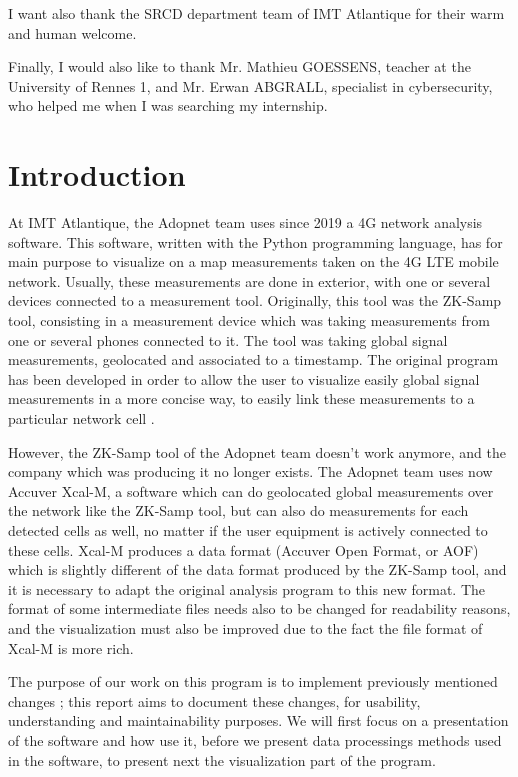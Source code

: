 \documentclass[a4paper, 11pt]{report}
\begin{document}
    I want also thank the SRCD department team of IMT Atlantique for their warm and human welcome. \newline
    
    Finally, I would also like to thank Mr. Mathieu GOESSENS, teacher at the University of Rennes 1, and Mr. Erwan ABGRALL, specialist in cybersecurity, who helped me when I was searching my internship.
    
    \newpage
    
    
    \section*{Introduction}
    At IMT Atlantique, the Adopnet team uses since 2019 a 4G network analysis software. This software, written with the Python programming language, has for main purpose to visualize on a map measurements taken on the 4G LTE mobile network. Usually, these measurements are done in exterior, with one or several devices connected to a measurement tool. Originally, this tool was the ZK-Samp tool, consisting in a measurement device which was taking measurements from one or several phones connected to it. The tool was taking global signal measurements, geolocated and associated to a timestamp. The original program has been developed in order to allow the user to visualize easily global signal measurements in a more concise way, to easily link these measurements to a particular network cell \cite{trieu_visualization_2019}. \newline
    
    However, the ZK-Samp tool of the Adopnet team doesn't work anymore, and the company which was producing it no longer exists. The Adopnet team uses now Accuver Xcal-M, a software which can do geolocated global measurements over the network like the ZK-Samp tool, but can also do measurements for each detected cells as well, no matter if the user equipment is actively connected to these cells. Xcal-M produces a data format (Accuver Open Format, or AOF) which is slightly different of the data format produced by the ZK-Samp tool, and it is necessary to adapt the original analysis program to this new format. The format of some intermediate files needs also to be changed for readability reasons, and the visualization must also be improved due to the fact the file format of Xcal-M is more rich.\newline
    
    The purpose of our work on this program is to implement previously mentioned changes ; this report aims to document these changes, for usability, understanding and maintainability purposes. We will first focus on a presentation of the software and how use it, before we present data processings methods used in the software, to present next the visualization part of the program.
\end{document}
